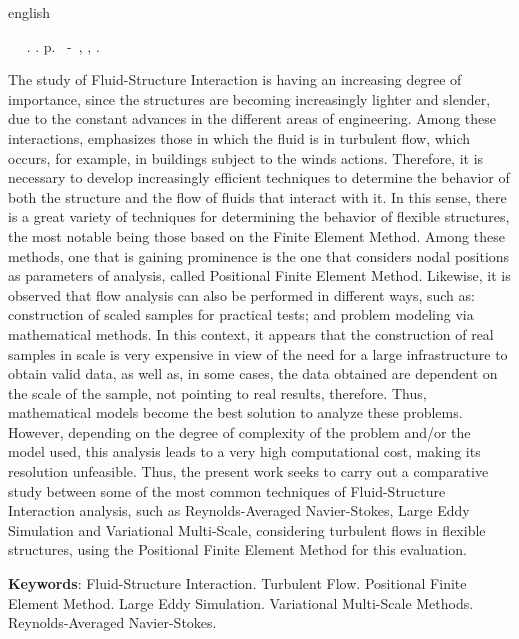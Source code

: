 \documentclass[_ArquivoPrincipal.tex]{subfiles}
\begin{document}
	\begin{resumo}[Abstract]
		\begin{otherlanguage*}{english}
			\begin{flushleft} 
				\setlength{\absparsep}{0pt} %
				\SingleSpacing 
				\imprimirautorabr~ ~\textbf{\imprimirtitleabstract}.	\imprimirdata.  \pageref{LastPage}p. 
				\imprimirtipotrabalho~-~\imprimirinstituicao, \imprimirlocal, 	\imprimirdata. 
			\end{flushleft}
			\OnehalfSpacing 
			The study of Fluid-Structure Interaction is having an increasing degree of importance, since the structures are becoming increasingly lighter and slender, due to the constant advances in the different areas of engineering. Among these interactions, emphasizes those in which the fluid is in turbulent flow, which occurs, for example, in buildings subject to the winds actions. Therefore, it is necessary to develop increasingly efficient techniques to determine the behavior of both the structure and the flow of fluids that interact with it. In this sense, there is a great variety of techniques for determining the behavior of flexible structures, the most notable being those based on the Finite Element Method. Among these methods, one that is gaining prominence is the one that considers nodal positions as parameters of analysis, called Positional Finite Element Method. Likewise, it is observed that flow analysis can also be performed in different ways, such as: construction of scaled samples for practical tests; and problem modeling via mathematical methods. In this context, it appears that the construction of real samples in scale is very expensive in view of the need for a large infrastructure to obtain valid data, as well as, in some cases, the data obtained are dependent on the scale of the sample, not pointing to real results, therefore. Thus, mathematical models become the best solution to analyze these problems. However, depending on the degree of complexity of the problem and/or the model used, this analysis leads to a very high computational cost, making its resolution unfeasible. Thus, the present work seeks to carry out a comparative study between some of the most common techniques of Fluid-Structure Interaction analysis, such as Reynolds-Averaged Navier-Stokes, Large Eddy Simulation and Variational Multi-Scale, considering turbulent flows in flexible structures, using the Positional Finite Element Method for this evaluation.
			\vspace{\onelineskip}
			
			\noindent 
			\textbf{Keywords}: Fluid-Structure Interaction. Turbulent Flow. Positional Finite Element Method. Large Eddy Simulation. Variational Multi-Scale Methods. Reynolds-Averaged Navier-Stokes.
		\end{otherlanguage*}
	\end{resumo}
\end{document}
